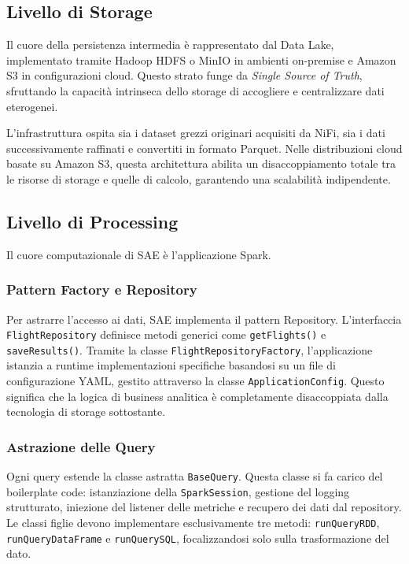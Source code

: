 \documentclass[conference]{IEEEtran}
\begin{document}
\subsection{Livello di Storage}\label{subsec:storage_layer_datalake}
Il cuore della persistenza intermedia è rappresentato dal Data Lake, implementato tramite Hadoop HDFS o MinIO in ambienti on-premise e Amazon S3 in configurazioni cloud.
Questo strato funge da \textit{Single Source of Truth}, sfruttando la capacità intrinseca dello storage di accogliere e centralizzare dati eterogenei.

L'infrastruttura ospita sia i dataset grezzi originari acquisiti da NiFi, sia i dati successivamente raffinati e convertiti in formato Parquet.
Nelle distribuzioni cloud basate su Amazon S3, questa architettura abilita un disaccoppiamento totale tra le risorse di storage e quelle di calcolo, garantendo una scalabilità indipendente.

\subsection{Livello di Processing}\label{subsec:processing_layer}
Il cuore computazionale di SAE è l'applicazione Spark.


\subsubsection{Pattern Factory e Repository}
Per astrarre l'accesso ai dati, SAE implementa il pattern Repository.
L'interfaccia \texttt{FlightRepository} definisce metodi generici come \texttt{getFlights()} e \texttt{saveResults()}.
Tramite la classe \texttt{FlightRepositoryFactory}, l'applicazione istanzia a runtime implementazioni specifiche basandosi su un file di configurazione YAML, gestito attraverso la classe \texttt{ApplicationConfig}.
Questo significa che la logica di business analitica è completamente disaccoppiata dalla tecnologia di storage sottostante\@.

\subsubsection{Astrazione delle Query}
Ogni query estende la classe astratta \texttt{BaseQuery}.
Questa classe si fa carico del boilerplate code: istanziazione della \texttt{SparkSession}, gestione del logging strutturato, iniezione del listener delle metriche e recupero dei dati dal repository.
Le classi figlie devono implementare esclusivamente tre metodi: \texttt{runQueryRDD}, \texttt{runQueryDataFrame} e \texttt{runQuerySQL}, focalizzandosi solo sulla trasformazione del dato\@.
\end{document}

